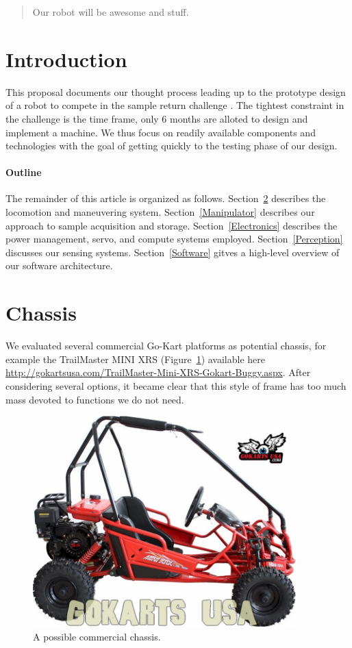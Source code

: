 \documentclass[12pt]{article}
\begin{document}
\maketitle

\begin{abstract}
Our robot will be awesome and stuff.
\end{abstract}

\section{Introduction}
This proposal documents our thought process leading up to the prototype design of a robot to compete in the sample return challenge \cite{rules}. The tightest constraint in the challenge is the time frame, only 6 months are alloted to design and implement a machine. We thus focus on readily available components and technologies with the goal of getting quickly to the testing phase of our design.

\paragraph{Outline}
The remainder of this article is organized as follows.
Section~\ref{Chassis} describes the locomotion and maneuvering system. Section~\ref{Manipulator} describes our approach to sample acquisition and storage. Section~\ref{Electronics} describes the power management, servo, and compute systems employed. Section~\ref{Perception} discusses our sensing systems. Section~\ref{Software} gitves a high-level overview of our software architecture.

\section{Chassis}\label{Chassis}

We evaluated several commercial Go-Kart platforms as potential chassis, for example the TrailMaster MINI XRS (Figure~\ref{fig_gokart}) available here \url{http://gokartsusa.com/TrailMaster-Mini-XRS-Gokart-Buggy.aspx}. After considering several options, it became clear that this style of frame has too much mass devoted to functions we do not need.

\begin{figure}[htbp]
\centering
\includegraphics[width=4in]{../assets/TrailMasterMINIXRS.jpg}
\caption{A possible commercial chassis.}
\label{fig_gokart}
\end{figure}
\end{document}
